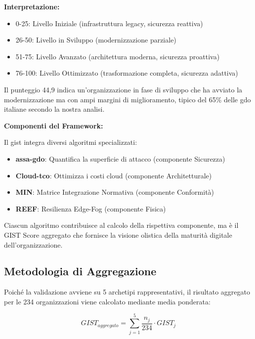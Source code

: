 \begin{tcolorbox}
\vspace{0.3cm}
\textbf{Interpretazione:}
\begin{itemize}
    \item 0-25: Livello Iniziale (infrastruttura legacy, sicurezza reattiva)
    \item 26-50: Livello in Sviluppo (modernizzazione parziale)
    \item 51-75: Livello Avanzato (architettura moderna, sicurezza proattiva)
    \item 76-100: Livello Ottimizzato (trasformazione completa, sicurezza adattiva)
\end{itemize}

Il punteggio 44,9 indica un'organizzazione in fase di sviluppo che ha avviato la modernizzazione ma con ampi margini di miglioramento, tipico del 65\% delle \gls{gdo} italiane secondo la nostra analisi.

\vspace{0.3cm}
\textbf{Componenti del Framework:}

Il \gls{gist} integra diversi algoritmi specializzati:
\begin{itemize}
    \item \textbf{\gls{assa-gdo}}: Quantifica la superficie di attacco (componente Sicurezza)
    \item \textbf{Cloud-\gls{tco}}: Ottimizza i costi cloud (componente Architetturale)
    \item \textbf{MIN}: Matrice Integrazione Normativa (componente Conformità)
    \item \textbf{REEF}: Resilienza Edge-Fog (componente Fisica)
\end{itemize}

Ciascun algoritmo contribuisce al calcolo della rispettiva componente, ma è il GIST Score aggregato che fornisce la visione olistica della maturità digitale dell'organizzazione.
\end{tcolorbox}

\subsection{Metodologia di Aggregazione}

Poiché la validazione avviene su 5 archetipi rappresentativi, il risultato aggregato per le 234 organizzazioni viene calcolato mediante media ponderata:

\begin{equation}
GIST_{aggregato} = \sum_{j=1}^{5} \frac{n_j}{234} \cdot GIST_j
\label{eq:gist_aggregato}
\end{equation}

